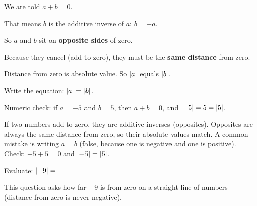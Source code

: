 \begin{steps}
  \item We are told $a + b = 0$.
  \item That means $b$ is the additive inverse of $a$: $b = -a$.
  \item So $a$ and $b$ sit on \textbf{opposite sides} of zero.
  \item Because they cancel (add to zero), they must be the \textbf{same distance} from zero.
  \item Distance from zero is absolute value. So $\left\lvert a \right\rvert$ equals $\left\lvert b \right\rvert$.
  \item Write the equation: $\left\lvert a \right\rvert = \left\lvert b \right\rvert$.
  \item Numeric check: if $a = -5$ and $b = 5$, then $a + b = 0$, and $\left\lvert -5 \right\rvert = 5 = \left\lvert 5 \right\rvert$.
\end{steps}


\noindent If two numbers add to zero, they are additive inverses (opposites).
Opposites are always the same distance from zero, so their absolute values
match. A common mistake is writing $a = b$ (false, because one is negative and
one is positive). Check: $-5 + 5 = 0$ and $\left\lvert -5 \right\rvert = \left\lvert 5 \right\rvert$.


\noindent Evaluate: $\left\lvert -9 \right\rvert = $


\noindent This question asks how far $-9$ is from zero on a straight line of
numbers (distance from zero is never negative).

